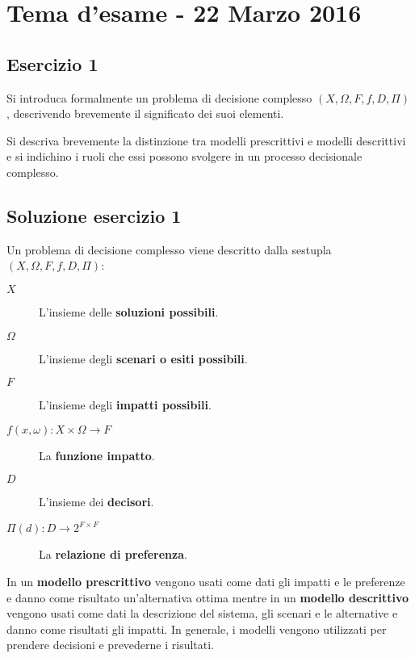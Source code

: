 \documentclass[\main/main.tex]{subfiles}
\begin{document}
\section{Tema d'esame - 22 Marzo 2016}

\subsection{Esercizio 1}
Si introduca formalmente un problema di decisione complesso $(X, \Omega, F, f, D, \Pi)$, descrivendo brevemente il significato dei suoi elementi.

Si descriva brevemente la distinzione tra modelli prescrittivi e modelli descrittivi e si indichino i ruoli che essi possono svolgere in un processo decisionale complesso.

\subsection{Soluzione esercizio 1}

Un problema di decisione complesso viene descritto dalla sestupla $(X, \Omega, F, f, D, \Pi)$:

\begin{description}
	\item [$X$] L'insieme delle \textbf{soluzioni possibili}.
	\item [$\Omega$] L'insieme degli \textbf{scenari o esiti possibili}.
	\item [$F$] L'insieme degli \textbf{impatti possibili}.
	\item [$f(x, \omega): X \times \Omega  \rightarrow F$] La \textbf{funzione impatto}.
	\item [$D$] L'insieme dei \textbf{decisori}.
	\item [$\Pi(d): D \rightarrow 2^{F\times F}$] La \textbf{relazione di preferenza}.
\end{description}

In un \textbf{modello prescrittivo} vengono usati come dati gli impatti e le preferenze e danno come risultato un'alternativa ottima mentre in un \textbf{modello descrittivo} vengono usati come dati la descrizione del sistema, gli scenari e le alternative e danno come risultati gli impatti. In generale, i modelli vengono utilizzati per prendere decisioni e prevederne i risultati.
\end{document}
